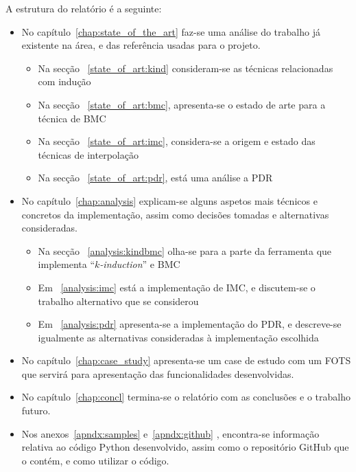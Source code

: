 \documentclass[11pt,a4paper]{report}%
\def\kind{``\textit{$k$-induction}''\xspace}
\begin{document}
A estrutura do relatório é a seguinte:
\begin{itemize}
\item No capítulo~\ref{chap:state_of_the_art} faz-se uma análise do trabalho
  já existente na área, e das referência usadas para o projeto.
\begin{itemize}
    \item Na secção ~\ref{state_of_art:kind} consideram-se as técnicas
    relacionadas com indução
    \item Na secção ~\ref{state_of_art:bmc}, apresenta-se o estado de arte
    para a técnica de BMC
    \item Na secção ~\ref{state_of_art:imc}, considera-se a origem e estado
    das técnicas de interpolação
    \item Na secção ~\ref{state_of_art:pdr}, está uma análise a PDR
\end{itemize}

\item No capítulo~\ref{chap:analysis} explicam-se alguns aspetos mais técnicos e concretos
da implementação, assim como decisões tomadas e alternativas consideradas.
\begin{itemize}
    \item Na secção ~\ref{analysis:kindbmc} olha-se para a parte da ferramenta
    que implementa \kind e BMC
    \item Em ~\ref{analysis:imc} está a implementação de IMC, e discutem-se
    o trabalho alternativo que se considerou
    \item Em ~\ref{analysis:pdr} apresenta-se a implementação do PDR, e descreve-se
    igualmente as alternativas consideradas à implementação escolhida
\end{itemize}

\item No capítulo~\ref{chap:case_study} apresenta-se um case de estudo com um FOTS que servirá para
apresentação das funcionalidades desenvolvidas.

\item No capítulo~\ref{chap:concl} termina-se o relatório com as conclusões e o trabalho futuro.

\item Nos anexos~\ref{apndx:samples} e~\ref{apndx:github} , encontra-se informação relativa ao código
Python desenvolvido, assim como o repositório GitHub que o contém, e como utilizar o código.

\end{itemize}
\end{document}
